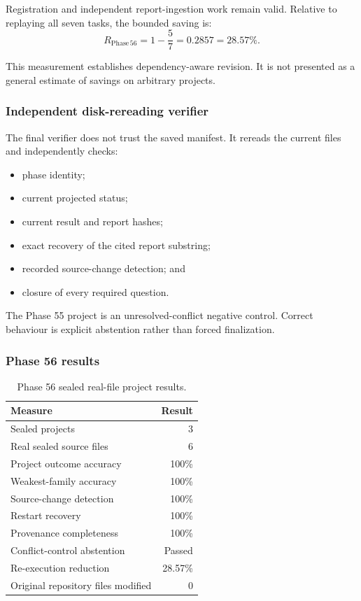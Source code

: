 Registration and independent report-ingestion work remain valid.  Relative
to replaying all seven tasks, the bounded saving is:
\[
R_{\mathrm{Phase\,56}}
=
1-\frac{5}{7}
=
0.2857
=
28.57\%.
\]

This measurement establishes dependency-aware revision.  It is not presented
as a general estimate of savings on arbitrary projects.

\subsubsection{Independent disk-rereading verifier}

The final verifier does not trust the saved manifest.  It rereads the current
files and independently checks:
\begin{itemize}
    \item phase identity;
    \item current projected status;
    \item current result and report hashes;
    \item exact recovery of the cited report substring;
    \item recorded source-change detection; and
    \item closure of every required question.
\end{itemize}

The Phase 55 project is an unresolved-conflict negative control.  Correct
behaviour is explicit abstention rather than forced finalization.

\subsubsection{Phase 56 results}

\begin{table}[htbp]
\centering
\begin{tabular}{lr}
\hline
\textbf{Measure} & \textbf{Result}\\
\hline
Sealed projects & 3\\
Real sealed source files & 6\\
Project outcome accuracy & 100\%\\
Weakest-family accuracy & 100\%\\
Source-change detection & 100\%\\
Restart recovery & 100\%\\
Provenance completeness & 100\%\\
Conflict-control abstention & Passed\\
Re-execution reduction & 28.57\%\\
Original repository files modified & 0\\
\hline
\end{tabular}
\caption{Phase 56 sealed real-file project results.}
\label{tab:phase56-results}
\end{table}

